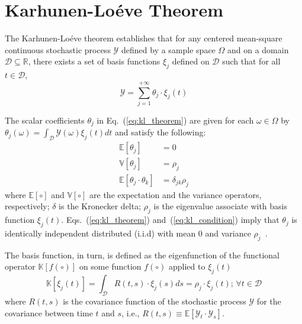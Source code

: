 \section{Karhunen-Lo\'eve Theorem}\label{app:kl_theorem}

The Karhunen-Lo\'eve theorem establishes that for any centered mean-square continuous stochastic process $\mathcal{Y}$ defined by a sample space $\Omega$ and on a domain $\mathcal{D} \subseteq \mathbb{R}$,
there exists a set of basis functions ${\xi_j}$ defined on $\mathcal{D}$ such that for all $t \in \mathcal{D}$,
\begin{equation}
	\mathcal{Y} = \sum_{j=1}^{+\infty} \theta_j \cdot \xi_j(t)
\label{eq:kl_theorem}
\end{equation}

The scalar coefficients $\theta_j$ in Eq.~(\ref{eq:kl_theorem}) are given for each $\omega \in \Omega$ by $\theta_j(\omega) = \int_\mathcal{D} \mathcal{Y}(\omega) \xi_j(t) dt$ and satisfy the following:
\begin{equation}
	\begin{split}
		\mathbb{E}[\theta_j] & = 0 \\
		\mathbb{V}[\theta_j] & = \rho_j \\
    \mathbb{E}[\theta_j\cdot \theta_k] & = \delta_{jk} \rho_j
	\end{split}
\label{eq:kl_condition}
\end{equation}
where $\mathbb{E}[\circ]$ and $\mathbb{V}[\circ]$ are the expectation and the variance operators, respectively;
$\delta$ is the Kronecker delta;
$\rho_j$ is the eigenvalue associate with basis function $\xi_j(t)$.
Eqs.~(\ref{eq:kl_theorem}) and~(\ref{eq:kl_condition}) imply that $\theta_j$ is identically independent distributed (i.i.d) with mean $0$ and variance $\rho_j$~\cite{Wang2008}.

The basis function, in turn, is defined as the eigenfunction of the functional operator $\mathbb{K}[f(\circ)]$ on some function $f(\circ)$ applied to $\xi_j(t)$
\begin{equation}
	\mathbb{K}[\xi_j(t)] = \int_{\mathcal{D}} R (t, s) \cdot \xi_j(s) ds = \rho_j \cdot \xi_j(t); \, \forall t \in \mathcal{D}
\label{eq:kl_operator}
\end{equation}
where $R (t, s)$ is the covariance function of the stochastic process $\mathcal{Y}$ for the covariance between time $t$ and $s$,
i.e., $R (t, s) \equiv \mathbb{E}[\mathcal{Y}_t \cdot \mathcal{Y}_s]$.

